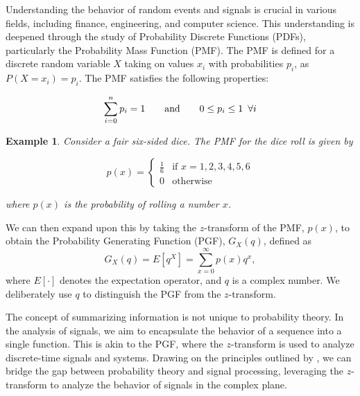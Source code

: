 \documentclass[a4paper]{report}
\newtheorem{example}{Example}
\begin{document}

Understanding the behavior of random events and signals is crucial in various fields, including finance, engineering, and computer science. This understanding is deepened through the study of Probability Discrete Functions (PDFs), particularly the Probability Mass Function (PMF). The PMF is defined for a discrete random variable $X$ taking on values $x_i$ with probabilities $p_i$, as $P(X=x_i) = p_i$. The PMF satisfies the following properties:

\begin{equation}
    \sum_{i=0}^n p_i = 1 \hspace{2em}\text{and}\hspace{2em} 0 \leq p_i \leq 1 \hspace{0.5em}\forall i
\end{equation}

\begin{example}
    Consider a fair six-sided dice. The PMF for the dice roll is given by
    
    \begin{equation}
        p(x) = \begin{cases}
            \frac{1}{6} & \text{if } x = 1, 2, 3, 4, 5, 6 \\
            0 & \text{otherwise}
        \end{cases}
    \end{equation}
    
    where $p(x)$ is the probability of rolling a number $x$.
\end{example}

\noindent We can then expand upon this by taking the $z$-transform of the PMF, $p(x)$, to obtain the Probability Generating Function (PGF), $G_X(q)$, defined as
\begin{equation}
	G_X(q) = E[q^X] = \sum^{\infty}_{x = 0} p(x)q^x,
\end{equation}
where $E[\cdot]$ denotes the expectation operator, and $q$ is a complex number. We deliberately use $q$ to distinguish the PGF from the $z$-transform. 

The concept of summarizing information is not unique to probability theory. In the analysis of signals, we aim to encapsulate the behavior of a sequence into a single function. This is akin to the PGF, where the $z$-transform is used to analyze discrete-time signals and systems. Drawing on the principles outlined by \citet{ross2014introduction}, we can bridge the gap between probability theory and signal processing, leveraging the $z$-transform to analyze the behavior of signals in the complex plane.
\end{document}
